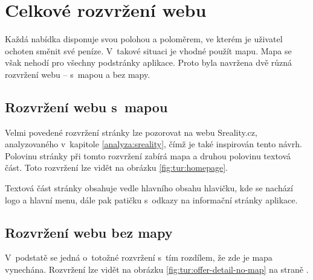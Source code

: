 \section{Celkové rozvržení webu}

\label{nur:layout}

Každá nabídka disponuje svou polohou a poloměrem, ve kterém je uživatel ochoten směnit své peníze. V~takové situaci je vhodné použít mapu. Mapa se však nehodí pro všechny podstránky aplikace. Proto byla navržena dvě různá rozvržení webu -- s~mapou a bez mapy.

\subsection{Rozvržení webu s~mapou}
Velmi povedené rozvržení stránky lze pozorovat na webu Sreality.cz, analyzovaného v~kapitole \ref{analyza:sreality}, čímž je také inspirován tento návrh. Polovinu stránky při tomto rozvržení zabírá mapa a druhou polovinu textová část. Toto rozvržení lze vidět na obrázku \ref{fig:tur:homepage}.

Textová část stránky obsahuje vedle hlavního obsahu hlavičku, kde se nachází logo a hlavní menu, dále pak patičku s~odkazy na informační stránky aplikace.

\subsection{Rozvržení webu bez mapy}
V~podstatě se jedná o~totožné rozvržení s~tím rozdílem, že zde je mapa vynechána. Rozvržení lze vidět na obrázku \ref{fig:tur:offer-detail-no-map} na straně \pageref{fig:tur:offer-detail-no-map}.